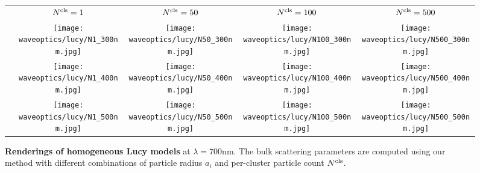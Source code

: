 \begin{figure}[!ht]
    \centering
    \setlength{\resLen}{2.55in}
    \setlength{\raiseLen}{1.3in}
    \addtolength{\tabcolsep}{-4pt}
    \begin{tabular}{ccccc}
		& $N^\mathrm{cls}=1$ & $N^\mathrm{cls}=50$ & $N^\mathrm{cls}=100$ & $N^\mathrm{cls}=500$
		\\
		\raisebox{\raiseLen}{\rotatebox[origin=c]{90}{$a_i=300\text{nm}$}} &
		\texttt{[image: waveoptics/lucy/N1\_300nm.jpg]} &
		\texttt{[image: waveoptics/lucy/N50\_300nm.jpg]} &
		\texttt{[image: waveoptics/lucy/N100\_300nm.jpg]} &
		\texttt{[image: waveoptics/lucy/N500\_300nm.jpg]}
		\\[-2pt]
		\raisebox{\raiseLen}{\rotatebox[origin=c]{90}{$a_i=400\text{nm}$}} &
		\texttt{[image: waveoptics/lucy/N1\_400nm.jpg]} &
		\texttt{[image: waveoptics/lucy/N50\_400nm.jpg]} &
		\texttt{[image: waveoptics/lucy/N100\_400nm.jpg]} &
		\texttt{[image: waveoptics/lucy/N500\_400nm.jpg]}
		\\[-2pt]
		\raisebox{\raiseLen}{\rotatebox[origin=c]{90}{$a_i=500\text{nm}$}} &
		\texttt{[image: waveoptics/lucy/N1\_500nm.jpg]} &
		\texttt{[image: waveoptics/lucy/N50\_500nm.jpg]} &
		\texttt{[image: waveoptics/lucy/N100\_500nm.jpg]} &
		\texttt{[image: waveoptics/lucy/N500\_500nm.jpg]} \\ [-10pt]
	\end{tabular}
    \caption[Renderings of homogeneous Lucy models]{\label{fig:waveoptics:lucycompare}
        \textbf{Renderings of homogeneous Lucy models} at $\lambda = 700\text{nm}$.
        The bulk scattering parameters are computed using our method with different combinations of particle radius $a_i$ and per-cluster particle count $N^\mathrm{cls}$.
    }
\end{figure}
